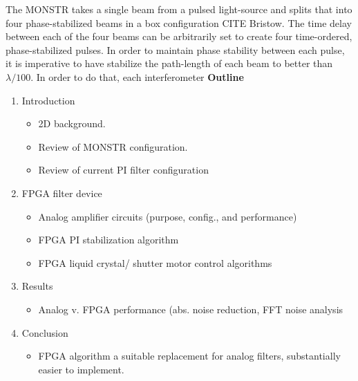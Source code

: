 \documentclass[letterpaper,12pt,amsmath,reprint,aip,jmp,onecolumn]{revtex4-1}
\begin{document}
\indent The MONSTR takes a single beam from a pulsed light-source and splits that into four phase-stabilized beams in a box configuration CITE Bristow. The time delay between each of the four beams can be arbitrarily set to create four time-ordered, phase-stabilized pulses. In order to maintain phase stability between each pulse, it is imperative to have stabilize the path-length of each beam to better than $\lambda/100$. In order to do that, each interferometer 
\Large{\textbf{Outline}}\\
\begin{enumerate}
\item Introduction
\begin{itemize}
\item 2D background.
\item Review of MONSTR configuration.
\item Review of current PI filter configuration
\end{itemize}
\item FPGA filter device
\begin{itemize}
\item Analog amplifier circuits (purpose, config., and performance)
\item FPGA PI stabilization algorithm
\item FPGA liquid crystal/ shutter motor control algorithms
\end{itemize}

\item Results
\begin{itemize}
\item Analog v. FPGA performance (abs. noise reduction, FFT noise analysis
\end{itemize}
\item Conclusion
\begin{itemize}
\item FPGA algorithm a suitable replacement for analog filters, substantially easier to implement.
\end{itemize}
\end{enumerate}
\end{document}
